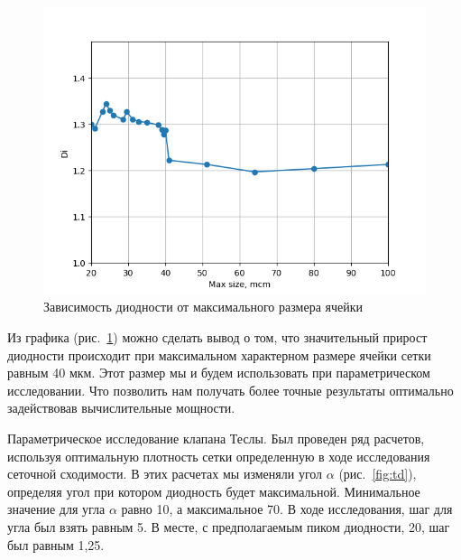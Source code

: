 \documentclass[10pt,a4paper]{book}
\begin{document}
                            
         
         \begin{figure}[H]
             \centering
             \includegraphics[width = 1\linewidth]{graphDiMaxSize}
             \caption{Зависимость диодности от максимального размера ячейки}
             \label{fig:graphDiMaxSize}
         \end{figure}
         
         Из графика (рис.~\ref{fig:graphDiMaxSize}) можно сделать вывод о том, что значительный прирост диодности происходит при максимальном характерном размере ячейки сетки равным 40 мкм. Этот размер мы и будем использовать при параметрическом исследовании. Что позволить нам получать более точные результаты оптимально задействовав вычислительные мощности. 
         
         
         Параметрическое исследование клапана Теслы. Был проведен ряд расчетов, используя оптимальную плотность сетки определенную в ходе исследования сеточной сходимости. В этих расчетах мы изменяли угол $ \alpha $ (рис.~\ref{fig:td}), определяя угол при котором диодность будет максимальной. Минимальное значение для угла $ \alpha $ равно 10\textdegree, а максимальное 70\textdegree. В ходе исследования, шаг для угла был взять равным 5\textdegree. В месте, с предполагаемым пиком диодности, 20\textdegree, шаг был равным 1,25\textdegree. 
         
\end{document}
